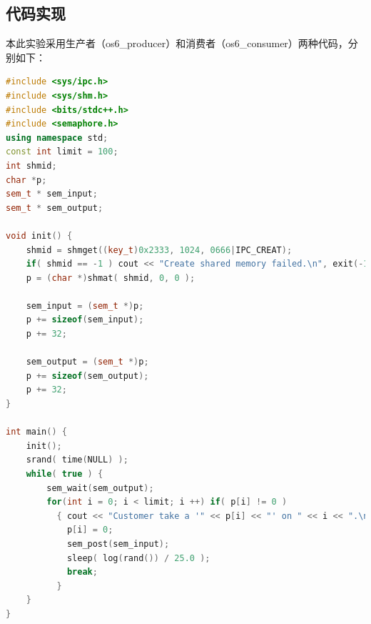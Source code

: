 \documentclass[UTF8]{ctexart}
\begin{document}
\subsection{代码实现}
本此实验采用生产者（os6\_producer）和消费者（os6\_consumer）两种代码，分别如下：
\begin{lstlisting}[language=c++, name=os6_consumer.cpp]
#include <sys/ipc.h>
#include <sys/shm.h>
#include <bits/stdc++.h>
#include <semaphore.h>
using namespace std;
const int limit = 100;
int shmid;
char *p;
sem_t * sem_input;
sem_t * sem_output;

void init() {
    shmid = shmget((key_t)0x2333, 1024, 0666|IPC_CREAT);
    if( shmid == -1 ) cout << "Create shared memory failed.\n", exit(-1);
    p = (char *)shmat( shmid, 0, 0 );
    
    sem_input = (sem_t *)p;
    p += sizeof(sem_input);
    p += 32;
    
    sem_output = (sem_t *)p;
    p += sizeof(sem_output);
    p += 32;
}

int main() {
    init();
    srand( time(NULL) );
    while( true ) {
        sem_wait(sem_output);
        for(int i = 0; i < limit; i ++) if( p[i] != 0 )
          { cout << "Customer take a '" << p[i] << "' on " << i << ".\n";
            p[i] = 0;
            sem_post(sem_input);
            sleep( log(rand()) / 25.0 );
            break;
          }
    }  
}
\end{lstlisting}
\end{document}
